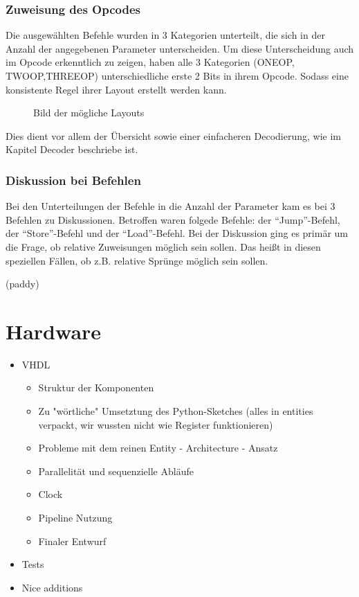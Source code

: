\documentclass[paper=a4,fontsize=12pt,twocolumn]{scrreprt}
\begin{document}
\subsection{Zuweisung des Opcodes}

Die ausgewählten Befehle wurden in 3 Kategorien unterteilt, die sich in der Anzahl der angegebenen Parameter unterscheiden. Um diese Unterscheidung auch im Opcode erkenntlich zu zeigen, haben alle 3 Kategorien (ONEOP, TWOOP,THREEOP) unterschiedliche erste 2 Bits in ihrem Opcode. Sodass eine konsistente Regel ihrer Layout erstellt werden kann.

\begin{figure}[h]
\centering
\caption{Bild der mögliche Layouts}
\end{figure}

Dies dient vor allem der Übersicht sowie einer einfacheren Decodierung, wie im Kapitel Decoder beschriebe ist. 


\subsection{Diskussion bei Befehlen}

Bei den Unterteilungen der Befehle in die Anzahl der Parameter kam es bei 3 Befehlen zu Diskussionen.
Betroffen waren folgede Befehle: der \enquote{Jump}-Befehl, der \enquote{Store}-Befehl und der \enquote{Load}-Befehl. 
Bei der Diskussion ging es primär um die Frage, ob relative Zuweisungen möglich sein sollen. Das heißt in diesen speziellen Fällen, ob z.B. relative Sprünge möglich sein sollen. 






(paddy)

\chapter{Hardware}


\begin{itemize}
    \item VHDL
    \begin{itemize}
        \item Struktur der Komponenten
        \item Zu "wörtliche" Umsetztung des Python-Sketches (alles in entities verpackt, wir wussten nicht wie Register funktionieren)
        \item Probleme mit dem reinen Entity - Architecture - Ansatz
        \item Parallelität und sequenzielle Abläufe
        \item Clock
        \item Pipeline Nutzung
        \item Finaler Entwurf
    \end{itemize}
    \item Tests
    \item Nice additions
\end{itemize}
\end{document}

